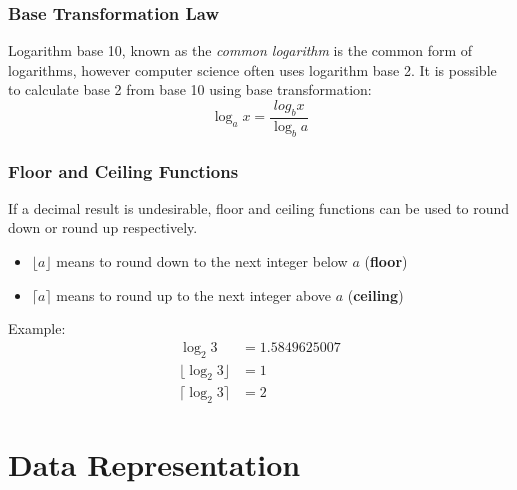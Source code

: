 \documentclass{article}
\begin{document}
\subsubsection{Base Transformation Law}
Logarithm base 10, known as the \emph{common logarithm} is the common form of logarithms,
however computer science often uses logarithm base 2.
It is possible to calculate base 2 from base 10 using base transformation:
\[\log_a x = \frac{log_b x}{\log_b a}\]
%
\newpage
\subsubsection{Floor and Ceiling Functions}
If a decimal result is undesirable,
floor and ceiling functions can be used to round down or round up respectively.
\begin{itemize}
    \item \(\lfloor a \rfloor\) means to round down to the next integer below \(a\) (\textbf{floor})
    \item \(\lceil a \rceil\) means to round up to the next integer above \(a\) (\textbf{ceiling})
\end{itemize}
Example:
\begin{align*}
    \log_2 3 &= 1.5849625007 \\
    \lfloor \log_2 3 \rfloor &= 1 \\
    \lceil \log_2 3 \rceil &= 2
\end{align*}

\newpage
\section{Data Representation}
\end{document}
